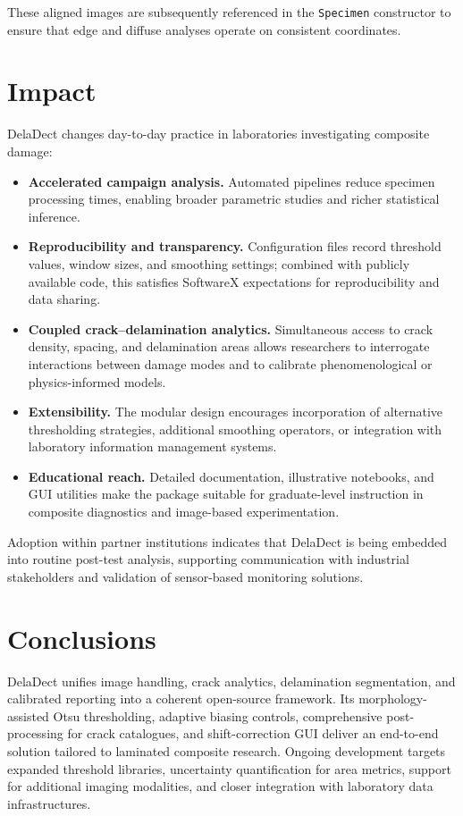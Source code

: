 \documentclass[preprint,12pt,a4paper]{elsarticle}
\begin{document}
These aligned images are subsequently referenced in the \texttt{Specimen} constructor to ensure that
edge and diffuse analyses operate on consistent coordinates.

\section{Impact}
DelaDect changes day-to-day practice in laboratories investigating composite damage:

\begin{itemize}
    \item \textbf{Accelerated campaign analysis.} Automated pipelines reduce specimen processing times,
    enabling broader parametric studies and richer statistical inference.

    \item \textbf{Reproducibility and transparency.} Configuration files record threshold values, window
    sizes, and smoothing settings; combined with publicly available code, this satisfies SoftwareX
    expectations for reproducibility and data sharing.

    \item \textbf{Coupled crack--delamination analytics.} Simultaneous access to crack density, spacing, and
    delamination areas allows researchers to interrogate interactions between damage modes and to calibrate
    phenomenological or physics-informed models.

    \item \textbf{Extensibility.} The modular design encourages incorporation of alternative thresholding
    strategies, additional smoothing operators, or integration with laboratory information management
    systems.

    \item \textbf{Educational reach.} Detailed documentation, illustrative notebooks, and GUI utilities
    make the package suitable for graduate-level instruction in composite diagnostics and image-based
    experimentation.
\end{itemize}

Adoption within partner institutions indicates that DelaDect is being embedded into routine post-test
analysis, supporting communication with industrial stakeholders and validation of sensor-based monitoring
solutions.

\section{Conclusions}
DelaDect unifies image handling, crack analytics, delamination segmentation, and calibrated reporting into
a coherent open-source framework. Its morphology-assisted Otsu thresholding, adaptive biasing controls,
comprehensive post-processing for crack catalogues, and shift-correction GUI deliver an end-to-end
solution tailored to laminated composite research. Ongoing development targets expanded threshold
libraries, uncertainty quantification for area metrics, support for additional imaging modalities, and
closer integration with laboratory data infrastructures.
\end{document}
